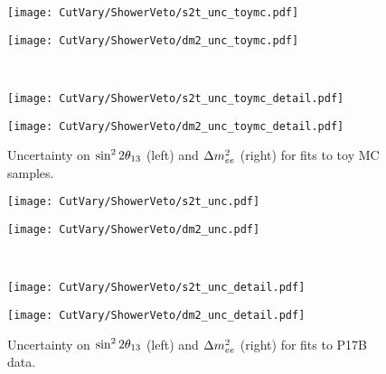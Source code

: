 \documentclass[../thesis.tex]{subfiles}
\begin{document}
\begin{figure}[ht]
  \begin{minipage}{0.5\linewidth}%
    \texttt{[image: CutVary/ShowerVeto/s2t\_unc\_toymc.pdf]}%
  \end{minipage}%
  \begin{minipage}{0.5\linewidth}%
    \texttt{[image: CutVary/ShowerVeto/dm2\_unc\_toymc.pdf]}%
  \end{minipage}\\
  \begin{minipage}{0.5\linewidth}%
    \texttt{[image: CutVary/ShowerVeto/s2t\_unc\_toymc\_detail.pdf]}%
  \end{minipage}%
  \begin{minipage}{0.5\linewidth}%
    \texttt{[image: CutVary/ShowerVeto/dm2\_unc\_toymc\_detail.pdf]}%
  \end{minipage}%
  \caption{Uncertainty on $\sin^2 2\theta_{13}$ (left) and $\Delta m^2_{ee}$ (right) for fits to toy MC samples. \fourShowerNote}
  \label{fig:cutVaryVetoEffToyUnc}
\end{figure}

\begin{figure}[ht]
  \begin{minipage}{0.5\linewidth}%
    \texttt{[image: CutVary/ShowerVeto/s2t\_unc.pdf]}%
  \end{minipage}%
  \begin{minipage}{0.5\linewidth}%
    \texttt{[image: CutVary/ShowerVeto/dm2\_unc.pdf]}%
  \end{minipage}\\
  \begin{minipage}{0.5\linewidth}%
    \texttt{[image: CutVary/ShowerVeto/s2t\_unc\_detail.pdf]}%
  \end{minipage}%
  \begin{minipage}{0.5\linewidth}%
    \texttt{[image: CutVary/ShowerVeto/dm2\_unc\_detail.pdf]}%
  \end{minipage}%
  \caption{Uncertainty on $\sin^2 2\theta_{13}$ (left) and $\Delta m^2_{ee}$ (right) for fits to P17B data. \fourShowerNote}
  \label{fig:cutVaryVetoEffDataUnc}
\end{figure}
\end{document}
